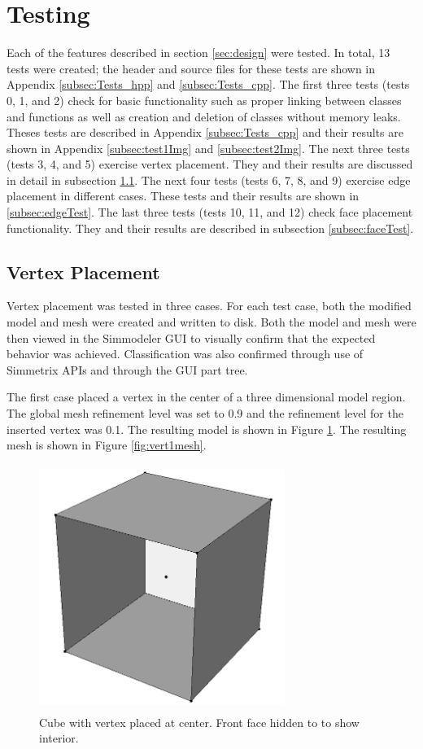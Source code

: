\documentclass[a4paper, 12pt]{article}
\begin{document}
\section{Testing} \label{sec:testing}
Each of the features described in section \ref{sec:design} were
tested. In total, 13 tests were created; the header and
source files for these tests are shown in 
Appendix \ref{subsec:Tests_hpp} and \ref{subsec:Tests_cpp}. The first three
tests (tests 0, 1, and 2) check for basic functionality such as proper linking 
between classes and functions as well as creation and deletion of classes 
without memory leaks. Theses tests are described in Appendix \ref{subsec:Tests_cpp}
and their results are shown in Appendix \ref{subsec:test1Img} 
and \ref{subsec:test2Img}. The next three tests (tests 3, 4, and 5) 
exercise vertex placement. They and their results are discussed in detail
in subsection \ref{subsec:vertexTest}. The next four tests (tests 6, 7, 8, and 9)
exercise edge placement in different cases. These tests and their results 
are shown in \ref{subsec:edgeTest}. The last three tests (tests 10, 11, and 12)
check face placement functionality. They and their results are described in 
subsection \ref{subsec:faceTest}.

\subsection{Vertex Placement} \label{subsec:vertexTest}
Vertex placement was tested in three cases. For each test case, both
the modified model and mesh were created and written to disk. Both 
the model and mesh were then viewed in the Simmodeler GUI to visually confirm
that the expected behavior was achieved. Classification was also confirmed
through use of Simmetrix APIs and through the GUI part tree. 

The first case placed a vertex in the center of a three dimensional
model region. The global mesh refinement level was set to 0.9 and the 
refinement level for the inserted vertex was 0.1.
The resulting model is shown in Figure \ref{fig:vert1model}.
The resulting mesh is shown in Figure \ref{fig:vert1mesh}.

\begin{figure}[H]
  \centering
  \includegraphics[width=8cm, height=8cm]{test3_smd}
  \caption{Cube with vertex placed at center. Front face hidden to 
        to show interior.}
  \label{fig:vert1model}
\end{figure}
\end{document}

